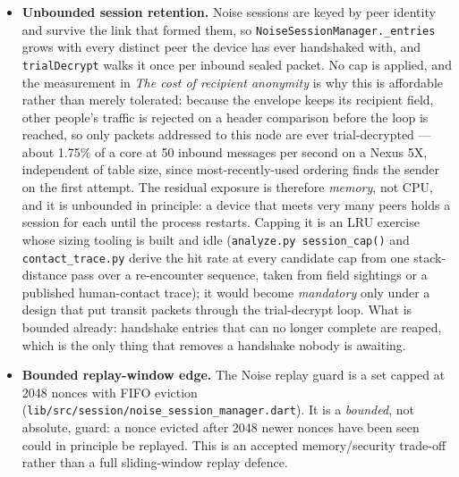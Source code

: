 \documentclass[11pt]{report}
\newcommand{\code}[1]{\texttt{\small #1}}
\begin{document}
\begin{itemize}
  \item \textbf{Unbounded session retention.} Noise sessions are keyed by peer identity and survive the link that formed them, so \code{NoiseSessionManager.\_entries} grows with every distinct peer the device has ever handshaked with, and \code{trialDecrypt} walks it once per inbound sealed packet. No cap is applied, and the measurement in \emph{The cost of recipient anonymity} is why this is affordable rather than merely tolerated: because the envelope keeps its recipient field, other people's traffic is rejected on a header comparison before the loop is reached, so only packets addressed to this node are ever trial-decrypted --- about 1.75\% of a core at 50 inbound messages per second on a Nexus 5X, independent of table size, since most-recently-used ordering finds the sender on the first attempt. The residual exposure is therefore \emph{memory}, not CPU, and it is unbounded in principle: a device that meets very many peers holds a session for each until the process restarts. Capping it is an LRU exercise whose sizing tooling is built and idle (\code{analyze.py session\_cap()} and \code{contact\_trace.py} derive the hit rate at every candidate cap from one stack-distance pass over a re-encounter sequence, taken from field sightings or a published human-contact trace); it would become \emph{mandatory} only under a design that put transit packets through the trial-decrypt loop. What is bounded already: handshake entries that can no longer complete are reaped, which is the only thing that removes a handshake nobody is awaiting.
  \item \textbf{Bounded replay-window edge.} The Noise replay guard is a set capped at 2048 nonces with FIFO eviction (\code{lib/src/session/noise\_session\_manager.dart}). It is a \emph{bounded}, not absolute, guard: a nonce evicted after 2048 newer nonces have been seen could in principle be replayed. This is an accepted memory/security trade-off rather than a full sliding-window replay defence.
\end{itemize}
\end{document}
